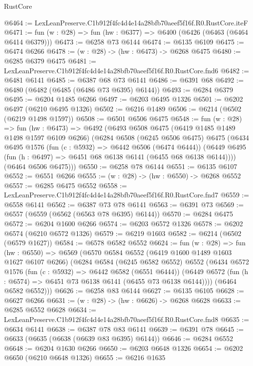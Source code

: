 \begin{lexlean}{RustCore}
\begin{coremodule}
@6464 := LexLeanPreserve.C1b912f4fc4d4e14a28bfb70aeef5f16f.R0.RustCore.iteF
@6471 := fun (w : @28) => fun (hw : @6377) => @6400 (@6426 (@6463 (@6464 @6414 @6379)))
@6473 := @6258 @73 @6144
@6474 := @6135 @6109
@6475 := @6474 @6266
@6478 := (w : @28) -> (hw : @6473) -> @6268 @6475
@6480 := @6285 @6379 @6475
@6481 := LexLeanPreserve.C1b912f4fc4d4e14a28bfb70aeef5f16f.R0.RustCore.fnd6
@6482 := @6481 @6141
@6485 := @6387 @68 @73 @6141
@6486 := @6391 @68
@6492 := @6480 (@6482 (@6485 (@6486 @73 @6395) @6144))
@6493 := @6284 @6379
@6495 := @6204 @1485 @6266
@6497 := @6203 @6495 @1326
@6501 := @6202 @6497 (@6210 @6495 @1326)
@6502 := @6216 @1489
@6506 := @6214 (@6502 (@6219 @1498 @1597))
@6508 := @6501 @6506 @6475
@6548 := fun (w : @28) =>
  fun (hw : @6473) =>
  @6492
    (@6493
      @6508
      @6475
      (@6419 @1485 @1489 @1498 @1597 @6109 @6266)
      (@6284
        @6508
        (@6245 @6506 @6475)
        @6475
        (@6434
          @6495
          @1576
          (fun (c : @5932) => @6442 @6506 (@6474 @6444))
          (@6449 @6495 (fun (h : @6497) => @6451 @68 @6138 @6141 (@6455 @68 @6138 @6144))))
        (@6464 @6506 @6475)))
@6550 := @6258 @78 @6144
@6551 := @6135 @6107
@6552 := @6551 @6266
@6555 := (w : @28) -> (hw : @6550) -> @6268 @6552
@6557 := @6285 @6475 @6552
@6558 := LexLeanPreserve.C1b912f4fc4d4e14a28bfb70aeef5f16f.R0.RustCore.fnd7
@6559 := @6558 @6141
@6562 := @6387 @73 @78 @6141
@6563 := @6391 @73
@6569 := @6557 (@6559 (@6562 (@6563 @78 @6395) @6144))
@6570 := @6284 @6475
@6572 := @6204 @1600 @6266
@6574 := @6203 @6572 @1326
@6578 := @6202 @6574 (@6210 @6572 @1326)
@6579 := @6219 @1603
@6582 := @6214 (@6502 (@6579 @1627))
@6584 := @6578 @6582 @6552
@6624 := fun (w : @28) =>
  fun (hw : @6550) =>
  @6569
    (@6570
      @6584
      @6552
      (@6419 @1600 @1489 @1603 @1627 @6107 @6266)
      (@6284
        @6584
        (@6245 @6582 @6552)
        @6552
        (@6434
          @6572
          @1576
          (fun (c : @5932) => @6442 @6582 (@6551 @6444))
          (@6449 @6572 (fun (h : @6574) => @6451 @73 @6138 @6141 (@6455 @73 @6138 @6144))))
        (@6464 @6582 @6552)))
@6626 := @6258 @83 @6144
@6627 := @6135 @6105
@6628 := @6627 @6266
@6631 := (w : @28) -> (hw : @6626) -> @6268 @6628
@6633 := @6285 @6552 @6628
@6634 := LexLeanPreserve.C1b912f4fc4d4e14a28bfb70aeef5f16f.R0.RustCore.fnd8
@6635 := @6634 @6141
@6638 := @6387 @78 @83 @6141
@6639 := @6391 @78
@6645 := @6633 (@6635 (@6638 (@6639 @83 @6395) @6144))
@6646 := @6284 @6552
@6648 := @6204 @1630 @6266
@6650 := @6203 @6648 @1326
@6654 := @6202 @6650 (@6210 @6648 @1326)
@6655 := @6216 @1635

\end{coremodule}
\end{lexlean}
